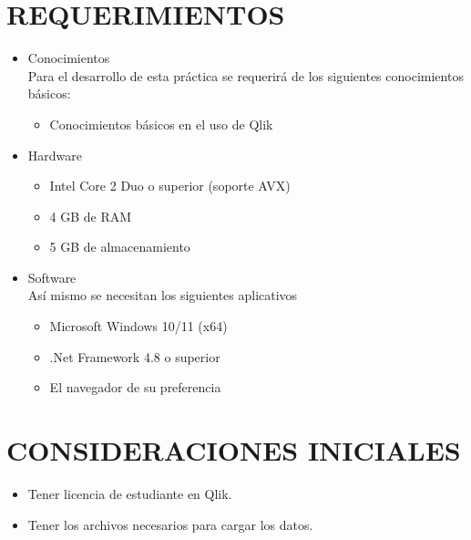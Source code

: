\documentclass[12pt,letterpaper]{article}
\begin{document}
    \section{REQUERIMIENTOS}
    \begin{itemize}
        \item Conocimientos\\
        Para el desarrollo de esta práctica se requerirá de los siguientes conocimientos básicos:
        \begin{itemize} 
            \item Conocimientos básicos en el uso de Qlik
        \end{itemize}
        \item Hardware
        \begin{itemize}
            \item Intel Core 2 Duo o superior (soporte AVX)
            \item 4 GB de RAM
            \item 5 GB de almacenamiento
        \end{itemize}
        \item Software\\
        Así mismo se necesitan los siguientes aplicativos
        \begin{itemize}
            \item Microsoft Windows 10/11 (x64)
            \item .Net Framework 4.8 o superior
            \item El navegador de su preferencia
        \end{itemize}
    \end{itemize}
    \section{CONSIDERACIONES INICIALES}
    \begin{itemize}
        \item Tener licencia de estudiante en Qlik.
        \item Tener los archivos necesarios para cargar los datos.
    \end{itemize}
    \newpage
\end{document}
